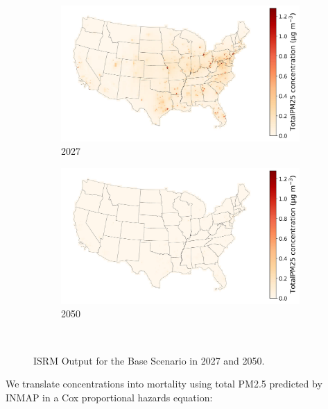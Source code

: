 \documentclass[a4paper]{article}
\theoremstyle{definition}
\theoremstyle{plain}
\begin{document}
\begin{figure}
    \centering
    \begin{subfigure}[b]{0.45\textwidth}
        \includegraphics[width=\textwidth]{Figures/Output/full-base-200/GenX/ISRM_2027_TotalPM25_concentrationmap.jpg}
        \caption{2027}
        \label{Subfig1}
    \end{subfigure}
    \hfill
    \begin{subfigure}[b]{0.45\textwidth}
        \includegraphics[width=\textwidth]{Figures/Output/full-base-200/GenX/ISRM_2050_TotalPM25_concentrationmap.jpg}
        \caption{2050}
        \label{Subfig2}
    \end{subfigure}\\
    \caption{ISRM Output for the Base Scenario in 2027 and 2050.}
\end{figure}
We translate concentrations into mortality using total PM2.5 predicted by INMAP in a Cox proportional hazards equation:
\end{document}
